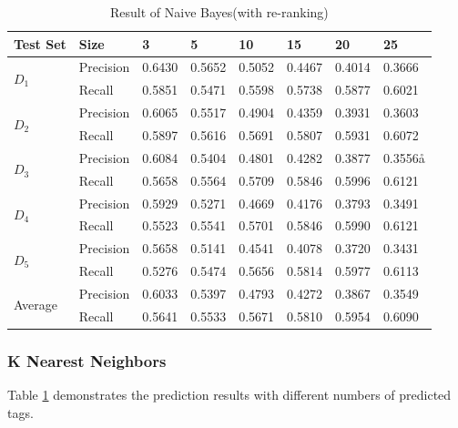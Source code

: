 \begin{table}
\centering \caption{\label{tb:nbresult}Result of Naive Bayes(with re-ranking)}
\begin{tabular}{l|l|l|l|l|l|l|l}
	\hline Test Set & Size & 3 & 5 & 10 & 15 & 20 & 25 \\
	\hline \multirow{2}{*}{$D_1$} & Precision & 0.6430 & 0.5652 & 0.5052 & 0.4467 & 0.4014 & 0.3666 \\
	\cline{2-8} & Recall & 0.5851 & 0.5471 & 0.5598 & 0.5738 & 0.5877 & 0.6021 \\
	
	\hline \multirow{2}{*}{$D_2$} & Precision & 0.6065 & 0.5517 & 0.4904 & 0.4359 & 0.3931 & 0.3603 \\
	\cline{2-8} & Recall & 0.5897 & 0.5616 & 0.5691 & 0.5807 & 0.5931 & 0.6072 \\
	
	\hline \multirow{2}{*}{$D_3$} & Precision & 0.6084 & 0.5404 & 0.4801 & 0.4282 & 0.3877 & 0.3556å \\
	\cline{2-8} & Recall & 0.5658 & 0.5564 & 0.5709 & 0.5846 & 0.5996 & 0.6121 \\
	
	\hline \multirow{2}{*}{$D_4$} & Precision & 0.5929 & 0.5271 & 0.4669 & 0.4176 & 0.3793 & 0.3491 \\
	\cline{2-8} & Recall & 0.5523 & 0.5541 & 0.5701 & 0.5846 & 0.5990 & 0.6121 \\
	
	\hline \multirow{2}{*}{$D_5$} & Precision & 0.5658 & 0.5141 & 0.4541 & 0.4078 & 0.3720 & 0.3431 \\
	\cline{2-8} & Recall & 0.5276 & 0.5474 & 0.5656 & 0.5814 & 0.5977 & 0.6113 \\
	
	\hline \multirow{2}{*}{Average} & Precision & 0.6033 & 0.5397 & 0.4793 & 0.4272 & 0.3867 & 0.3549 \\
	\cline{2-8} & Recall & 0.5641 & 0.5533 & 0.5671 & 0.5810 & 0.5954 & 0.6090 \\
	
	\hline
\end{tabular}
\end{table}


\subsubsection{K Nearest Neighbors}
Table \ref{tb:nbresult} demonstrates the prediction results with different numbers of predicted tags.

